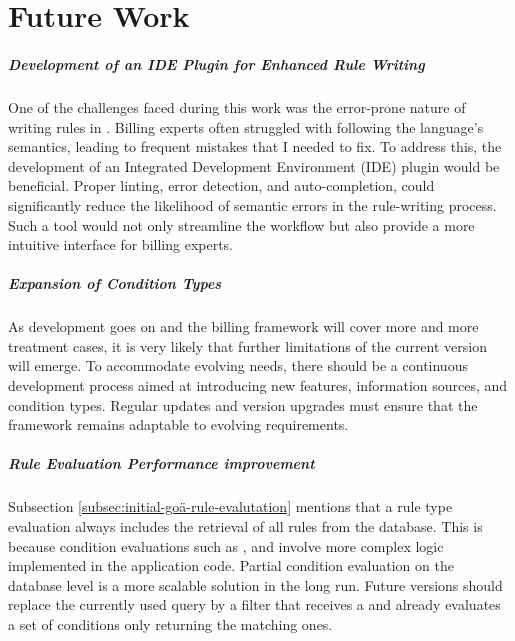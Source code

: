\chapter{Future Work}\label{ch:future-work}

\paragraph{Development of an IDE Plugin for Enhanced Rule Writing}
One of the challenges faced during this work was the error-prone nature of writing rules in \RF.
Billing experts often struggled with following the language's semantics, leading to frequent mistakes that I needed to fix.
To address this, the development of an Integrated Development Environment (IDE) plugin would be beneficial.
Proper linting, error detection, and auto-completion, could significantly reduce the likelihood of semantic errors
in the rule-writing process.
Such a tool would not only streamline the workflow but also provide a more intuitive interface for billing experts.

\paragraph{Expansion of Condition Types}
As development goes on and the billing framework will cover more and more treatment cases,
it is very likely that further limitations of the current version will emerge.
To accommodate evolving needs, there should be a continuous development process aimed at introducing new features,
information sources, and condition types.
Regular updates and version upgrades must ensure that the framework remains adaptable to evolving requirements.

\paragraph{Rule Evaluation Performance improvement}
Subsection \ref{subsec:initial-goä-rule-evalutation} mentions that a rule type evaluation always includes the retrieval of all rules from the database.
This is because condition evaluations such as \anamnesisBlocks, \physicalBlocks and \requiredIcdCodes involve more complex logic implemented in the application code.
Partial condition evaluation on the database level is a more scalable solution in the long run.
Future versions should replace the currently used  query by a filter that receives a \REI and already evaluates a set of conditions only returning the matching ones.

